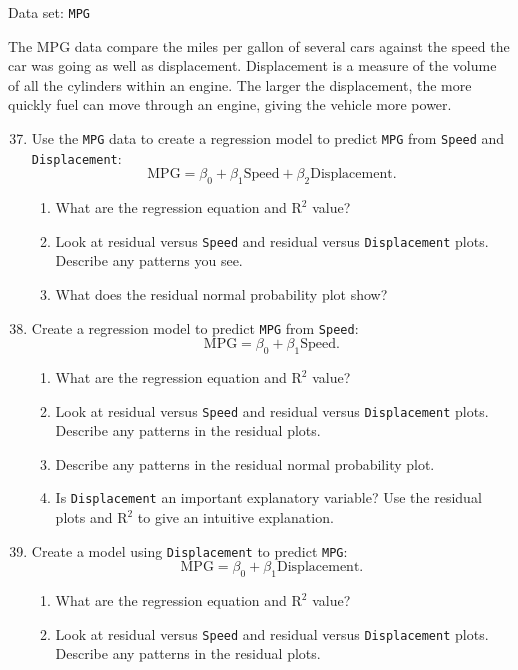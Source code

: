 \documentclass[
]{book}
\begin{document}
Data set: \texttt{MPG}

The MPG data compare the miles per gallon of several cars against the speed the car was going as well as displacement. Displacement is a measure of the volume of all the cylinders within an engine. The larger the displacement, the more quickly fuel can move through an engine, giving the vehicle more power.

\begin{enumerate}
  \setcounter{enumi}{36}

  \item Use the \texttt{MPG} data to create a regression model to predict \texttt{MPG} from \texttt{Speed} and \texttt{Displacement}:  
  \[
  \mathrm{MPG} = \beta_0 + \beta_1 \mathrm{Speed} + \beta_2 \mathrm{Displacement}.
  \]
  \begin{enumerate}
    \item What are the regression equation and $\mathrm{R}^2$ value?
    \item Look at residual versus \texttt{Speed} and residual versus \texttt{Displacement} plots. Describe any patterns you see.
    \item What does the residual normal probability plot show?
  \end{enumerate}

  \item Create a regression model to predict \texttt{MPG} from \texttt{Speed}:  
  \[
  \mathrm{MPG} = \beta_0 + \beta_1 \mathrm{Speed}.
  \]
  \begin{enumerate}
    \item What are the regression equation and $\mathrm{R}^2$ value?
    \item Look at residual versus \texttt{Speed} and residual versus \texttt{Displacement} plots. Describe any patterns in the residual plots.
    \item Describe any patterns in the residual normal probability plot.
    \item Is \texttt{Displacement} an important explanatory variable? Use the residual plots and $\mathrm{R}^2$ to give an intuitive explanation.
  \end{enumerate}

  \item Create a model using \texttt{Displacement} to predict \texttt{MPG}:  
  \[
  \mathrm{MPG} = \beta_0 + \beta_1 \mathrm{Displacement}.
  \]
  \begin{enumerate}
    \item What are the regression equation and $\mathrm{R}^2$ value?
    \item Look at residual versus \texttt{Speed} and residual versus \texttt{Displacement} plots. Describe any patterns in the residual plots.
  \end{enumerate}


\end{enumerate}
\end{document}
